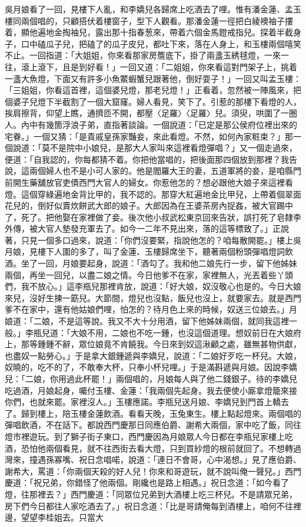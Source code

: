 吳月娘看了一回，見樓下人亂，和李嬌兒各歸席上吃酒去了哩。惟有潘金蓮、孟玉樓同兩個唱的，只顧搭伏着樓窗子，型下人觀看。那潘金蓮一徑把白綾襖袖子摟着，顯他遍地金掏袖兒，露出那十指春葱來，帶着六個金馬鐙戒指兒。探着半截身子，口中磕瓜子兒，把磕了的瓜子皮兒，都吐下來，落在人身上，和玉樓兩個嘻笑不止。一回指道：「大姐姐，你來看那家房簷底下，掛了兩盞玉綉毬燈，一來一往，滾上滾下，且是到好看！」一回又道：「二姐姐，你來看這對門架子上，挑着一盞大魚燈，下面又有許多小魚鱉蝦蟹兒跟著他，倒好耍子！」一回又叫孟玉樓：「三姐姐，你看這首裡，這個婆兒燈，那老兒燈！」正看着，忽然被一陣風來，把個婆子兒燈下半截割了一個大窟窿。婦人看見，笑下了。引惹的那樓下看燈的人，挨肩擦背，仰望上瞧，通擠匝不開，都壓〈足羅〉〈足羅〉兒。須臾，哄圍了一圈人。內中有幾箇浮浪子弟，直指著談論。一個說道：「已定是那公侯府位裡出來的宅眷。」一個又猜：「是貴戚皇孫家豔妾，來此看燈。不然，如何內家粧束？」那一個說道：「莫不是院中小娘兒，是那大人家叫來這裡看燈彈唱？」又一個走過來，便道：「自我認的，你每都猜不着。你把他當唱的，把後面那四個放到那裡？我告說，這兩個婦人也不是小可人家的。他是閻羅大王的妻，五道軍將的妾，是咱縣門前開生藥舖放官吏債西門大官人的婦女。你惹他怎的？想必跟他大娘子來這裡看燈。這個穿綠遍地金背比甲的，我不認的。那穿大紅遍地金比甲兒，上帶着個翠面花兒的，倒好似賣炊餅武大郎的娘子。大郎因為在王婆茶房內捉姦，被大官踢中了，死了。把他娶在家裡做了妾。後次他小叔武松東京回來告狀，誤打死了皂隸李外傳，被大官人墊發充軍去了。如今一二年不見出來，落的這等標致了。」正說著，只見一個多口過來，說道：「你們沒要緊，指說他怎的？咱每散開罷。」樓上吳月娘，見樓下人圍的多了，叫了金蓮、玉樓歸席坐下，聽著兩個粉頭彈唱燈詞飲酒。坐了一回，月娘要起身，說道：「酒勾了。我和他二娘先行一步，留下他姊妹兩個，再坐一回兒，以盡二娘之情。今日他爹不在家，家裡無人，光丟着些丫頭們，我不放心。」這李瓶兒那裡肯放，說道：「好大娘，奴沒敬心也是的。今日大娘來兒，沒好生揀一筯兒。大節間，燈兒也沒點，飯兒也沒上，就要家去。就是西門爹不在家中，還有他姑娘們哩，怕怎的？待月色上來的時候，奴送三位娘去。」月娘道：「二娘，不是這等說。我又不大十分用酒，留下他姊妹兩個，就同我這裡一般。」李瓶兒道：「大娘不用，二娘也不吃一鍾，也沒這個道理。想奴前日在大娘府上，那等鍾鍾不辭，眾位娘竟不肯饒我。今日來到奴這湫顧之處，雖無甚物供獻，也盡奴一點勞心。」于是拿大銀鍾遞與李嬌兒，說道：「二娘好歹吃一杯兒。大娘，奴曉的，吃不的了，不敢奉大杯，只奉小杯兒哩。」于是滿斟遞與月娘。因說李嬌兒：「二娘，你用過此杯罷！」兩個唱的，月娘每人與了他二錢銀子。待的李嬌兒吃過酒，月娘起身，囑付玉樓、金蓮：「我兩個先起身。我去便使小廝拿燈籠來接你們，也就來罷。家裡沒人。」玉樓應諾。李瓶兒送月娘、李嬌兒到門首上轎去了。歸到樓上，陪玉樓金蓮飲酒。看看天晚，玉兔東生。樓上點起燈來。兩個唱的彈唱飲酒，不在話下。都說西門慶那日同應伯爵、謝希大兩個，家中吃了飯，同往燈巿裡遊玩。到了獅子街子東口，西門慶因為月娘眾人今日都在李瓶兒家樓上吃酒，恐怕他兩個看見，就不往西街去看大燈，只到買紗燈的根前就回了。不想轉過灣來，撞遇孫寡嘴、祝日念唱喏，說道：「連日不會哥，心中渴想。」見了應伯爵、謝希大，罵道：「你兩個天殺的好人兒！你來和哥遊玩，就不說叫俺一聲兒。」西門慶道：「祝兄弟，你錯怪了他兩個。剛纔也是路上相遇。」祝日念道：「如今看了燈，往那裡去？」西門慶道：「同眾位兄弟到大酒樓上吃三杯兒。不是請眾兄弟，房下們今日都往人家吃酒去了。」祝日念道：「比是哥請俺每到酒樓上，咱何不往裡邊，望望李桂姐去。只當大